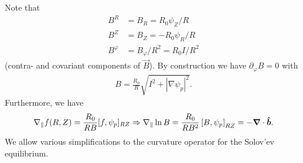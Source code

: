 Note that
\begin{align}
    B^R&=B_R = R_0\psi_Z/R \\
    B^Z&=B_Z = - R_0\psi_R/R \\
    B^\varphi &= B_\varphi/R^2 = R_0I/R^2
\end{align}
(contra- and covariant components of $\vec B$).
By construction we have $\partial_\varphi B = 0$ with
\begin{align}
  B = \frac{R_0}{R}\sqrt{ {I^2 + |\nabla \psi_p|^2}}.
    \label{}
\end{align}
Furthermore, we have
\begin{align}
  \nabla_\parallel f(R,Z) = \frac{R_0}{RB}[f,\psi_p]_{RZ}\Rightarrow \nabla_\parallel \ln B = \frac{R_0}{RB^2}\left[B, \psi_p\right]_{RZ} = -{\boldsymbol{\nabla}}\cdot\bm{\hat{b}}.
\end{align}
We allow various simplifications to the curvature operator
for the Solov'ev equilibrium.


